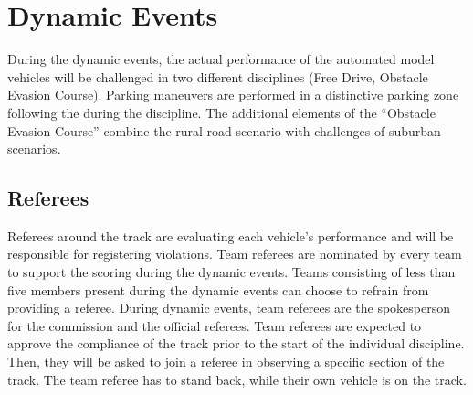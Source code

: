 \chapter{Dynamic Events}

During the dynamic events, the actual performance of the automated model
vehicles will be challenged in two different disciplines (Free Drive, Obstacle 
Evasion Course). Parking maneuvers are performed in a distinctive parking zone 
following the  during the 
discipline. The additional elements of the “Obstacle Evasion Course” combine
the rural road scenario with challenges of suburban scenarios.

\section{Referees}

Referees around the track are evaluating each vehicle’s performance and will be
responsible for registering violations. Team referees are nominated by every
team to support the scoring during the dynamic events. Teams consisting of less
than five members present during the dynamic events can choose to refrain from
providing a referee. During dynamic events, team referees are the spokesperson
for the commission and the official referees. Team referees are expected to
approve the compliance of the track prior to the start of the individual
discipline. Then, they will be asked to join a referee in observing a specific
section of the track. The team referee has to stand back, while their own
vehicle is on the track.


